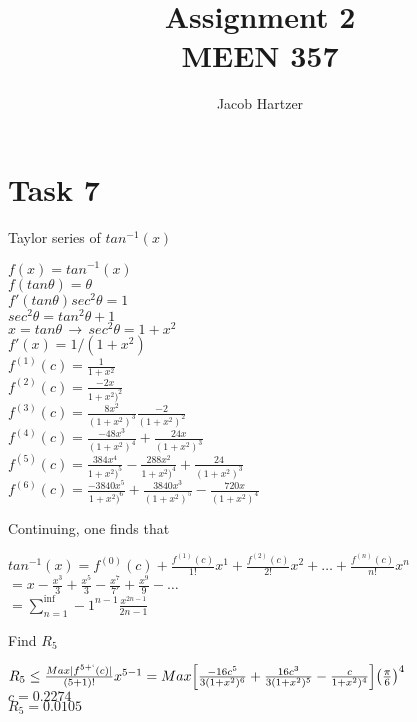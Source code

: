\documentclass[12pt]{article}
\newenvironment{problem}[2][Problem]{\begin{trivlist}
\item[\hskip \labelsep {\bfseries #1}\hskip \labelsep {\bfseries #2.}]}{\end{trivlist}}
\begin{document}
 
 
\title{Assignment 2\\ MEEN 357}
\author{Jacob Hartzer}
\maketitle
 
\section*{Task 7}
\begin{problem}{i} Taylor series of $tan^{-1}(x)$
\begin{center}
$f(x) = tan^{-1}(x)$\\
$f(tan\theta{}) = \theta{}$\\$
f'(tan\theta{})sec^2\theta{}=1$\\$
sec^2\theta{} =tan^2\theta+1$\\$
x = tan\theta{} \,\to\, sec^2 \theta{}=1+x^2$\\$
f'(x)=1/(1+x^2 )$\\$
f^{(1)} (c)=\frac{1}{1+x^2}$\\$
f^{(2)} (c)=\frac{-2x}{1+x^2)^2}$\\$
f^{(3)} (c)=\frac{8x^2}{(1+x^2)^3} \frac{-2}{(1+x^2)^2} $\\$
f^{(4)} (c)=\frac{-48x^3}{(1+x^2)^4}+\frac{24x}{(1+x^2)^3} $\\$
f^{(5)} (c)=\frac{384x^4}{1+x^2)^5}-\frac{288x^2}{1+x^2 )^4}+\frac{24}{(1+x^2)^3} $\\$
f^{(6)} (c)=\frac{-3840x^5}{1+x^2)^6} + \frac{3840x^3}{(1+x^2)^5} -\frac{720x}{(1+x^2)^4} $
\end{center}
Continuing, one finds that 
\begin{center}
$tan^{-1} (x)=f^{(0)} (c)+\frac{f^{(1)} (c)}{1!}x^1+\frac{f^{(2)} (c)}{2!}x^2+\dots{}+\frac{f^{(n)} (c)}{n!} x^n$\\
$=x-\frac{x^3}{3}+\frac{x^5}{3}-\frac{x^7}{7'}+\frac{x^9}{9}-\dots{}$\\ 
$=\sum^{\inf}_{n=1}-1^{n-1}  \frac{x^{2n-1}}{2n-1}$
\end{center}
\end{problem}

\begin{problem}{ii} Find $R_5$
\begin{center}
$R_5 \leq \frac{Max|f^{5+`}(c)|}{(5+1)!}x^{5-1}=Max\Big[\frac{-16c^5}{3(1+x^2 )^6}+\frac{16c^3}{3(1+x^2)^5}-\frac{c}{1+x^2 )^4}  \Big]\big( \frac{\pi}{6} \big)^4$\\
$c = 0.2274$\\
$R_5 = 0.0105$
\end{center}
\end{problem}
\end{document}
